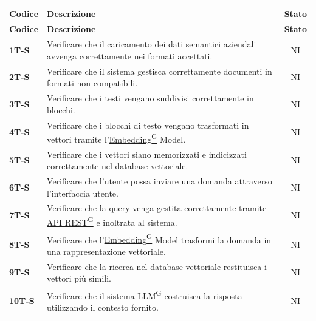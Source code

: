 \documentclass{article}
\begin{document}
\begin{longtable}{|>{\centering\arraybackslash}m{}|>{\raggedright\arraybackslash}m{}|c|}
    \hline
    \textbf{Codice} & \textbf{Descrizione} & \textbf{Stato} \\
    \hline
    \endfirsthead
    \hline
    \textbf{Codice} & \textbf{Descrizione} & \textbf{Stato} \\
    \hline
    \endhead
    \hline
    \endfoot
    \hline
    \textbf{1T-S} & Verificare che il caricamento dei dati semantici aziendali avvenga correttamente nei formati accettati. & NI \\
    \hline
    \textbf{2T-S} & Verificare che il sistema gestisca correttamente documenti in formati non compatibili. & NI \\
    \hline
    \textbf{3T-S} & Verificare che i testi vengano suddivisi correttamente in blocchi. & NI \\
    \hline
    \textbf{4T-S} & Verificare che i blocchi di testo vengano trasformati in vettori tramite l’\href{https://code7crusaders.github.io/docs/PB/documentazione_interna/glossario.html#embedding}{Embedding\textsuperscript{G}} Model. & NI \\
    \hline
    \textbf{5T-S} & Verificare che i vettori siano memorizzati e indicizzati correttamente nel database vettoriale. & NI \\
    \hline
    \textbf{6T-S} & Verificare che l’utente possa inviare una domanda attraverso l’interfaccia utente. & NI \\
    \hline
    \textbf{7T-S} & Verificare che la query venga gestita correttamente tramite \href{https://code7crusaders.github.io/docs/PB/documentazione_interna/glossario.html#api-rest-representational-state-transfer}{API REST\textsuperscript{G}} e inoltrata al sistema. & NI \\
    \hline
    \textbf{8T-S} & Verificare che l’\href{https://code7crusaders.github.io/docs/PB/documentazione_interna/glossario.html#embedding}{Embedding\textsuperscript{G}} Model trasformi la domanda in una rappresentazione vettoriale. & NI \\
    \hline
    \textbf{9T-S} & Verificare che la ricerca nel database vettoriale restituisca i vettori più simili. & NI \\
    \hline
    \textbf{10T-S} & Verificare che il sistema \href{https://code7crusaders.github.io/docs/PB/documentazione_interna/glossario.html#llm-large-language-model}{LLM\textsuperscript{G}} costruisca la risposta utilizzando il contesto fornito. & NI \\

\end{longtable}
\end{document}
